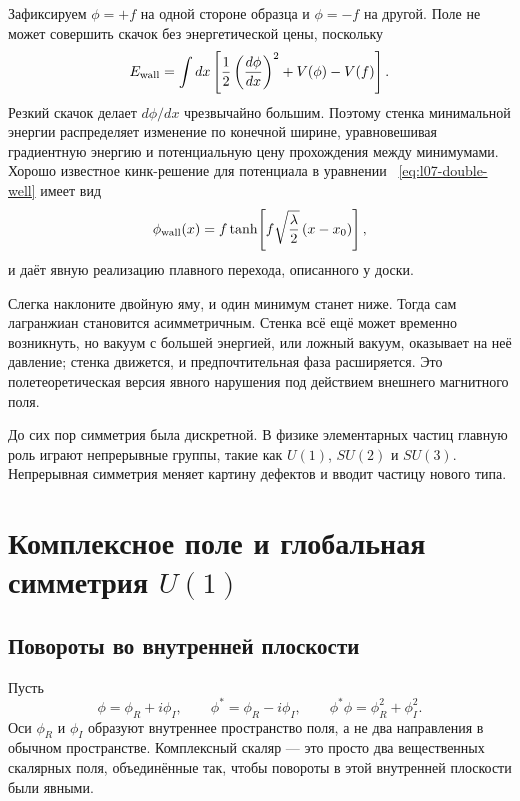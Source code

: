 Зафиксируем \(\phi=+f\) на одной стороне образца и \(\phi=-f\) на другой. Поле не может совершить скачок без энергетической цены, поскольку
\begin{equation}
  E_{\rm wall}
  =\int dx\left[
      \frac12\left(\frac{d\phi}{dx}\right)^2+V(\phi)-V(f)
    \right].
  \label{eq:l07-wall-energy}
\end{equation}
Резкий скачок делает \(d\phi/dx\) чрезвычайно большим. Поэтому стенка минимальной энергии распределяет изменение по конечной ширине, уравновешивая градиентную энергию и потенциальную цену прохождения между минимумами. Хорошо известное кинк-решение для потенциала в уравнении ~\eqref{eq:l07-double-well} имеет вид
\begin{equation}
  \phi_{\rm wall}(x)
  =f\tanh\!\left[f\sqrt{\frac{\lambda}{2}}\,(x-x_0)\right],
  \label{eq:l07-kink}
\end{equation}
и даёт явную реализацию плавного перехода, описанного у доски.

Слегка наклоните двойную яму, и один минимум станет ниже. Тогда сам лагранжиан становится асимметричным. Стенка всё ещё может временно возникнуть, но вакуум с большей энергией, или ложный вакуум, оказывает на неё давление; стенка движется, и предпочтительная фаза расширяется. Это полетеоретическая версия явного нарушения под действием внешнего магнитного поля.

До сих пор симметрия была дискретной. В физике элементарных частиц главную роль играют непрерывные группы, такие как \(U(1)\), \(SU(2)\) и \(SU(3)\). Непрерывная симметрия меняет картину дефектов и вводит частицу нового типа.

\section{Комплексное поле и глобальная симметрия \texorpdfstring{\(U(1)\)}{U(1)}}

\subsection{Повороты во внутренней плоскости}

Пусть
\begin{equation}
  \phi=\phi_R+i\phi_I,
  \qquad
  \phi^*=\phi_R-i\phi_I,
  \qquad
  \phi^*\phi=\phi_R^2+\phi_I^2.
  \label{eq:l07-components}
\end{equation}
Оси \(\phi_R\) и \(\phi_I\) образуют внутреннее пространство поля, а не два направления в обычном пространстве. Комплексный скаляр — это просто два вещественных скалярных поля, объединённые так, чтобы повороты в этой внутренней плоскости были явными.

